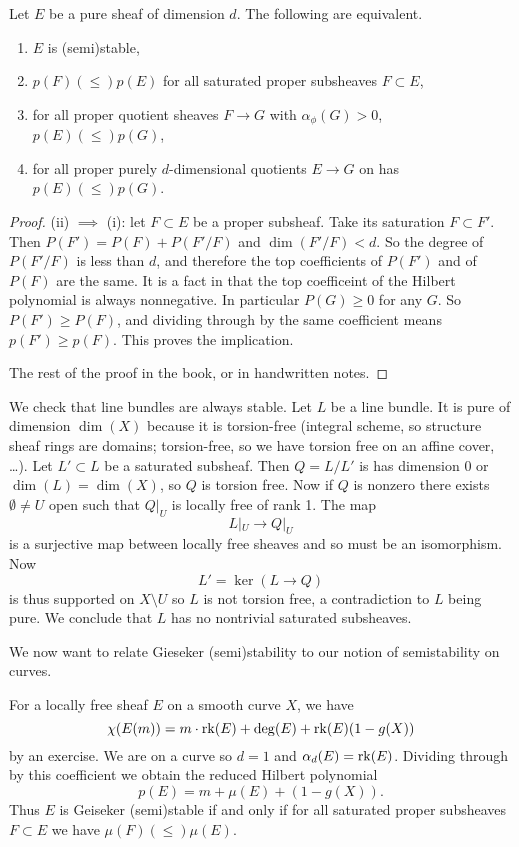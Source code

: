 \begin{proposition}
	Let $E$ be a pure sheaf of dimension $d$. The following are equivalent. 
	\begin{enumerate}[label=(\roman*)]
    	\item $E$ is (semi)stable,
		\item $p(F) (\leq) p(E)$ for all saturated proper subsheaves $F \subset E$,
		\item for all proper quotient sheaves $F \to G$ with $\alpha_\phi(G) > 0$, $p(E) (\leq) p(G)$, 
		\item for all proper purely $d$-dimensional quotients $E \to G$ on has $p(E) (\leq) p(G)$. 
    \end{enumerate}
\end{proposition}
\begin{proof}
	(ii) $\implies$ (i): let $F \subset E$ be a proper subsheaf. Take its saturation $F \subset F'$. Then $P(F') = P(F) + P(F'/F)$ and $\dim(F'/F) < d$.  
	So the degree of $P(F'/F)$ is less than $d$, and therefore the top coefficients of $P(F')$ and of $P(F)$ are the same. 
	It is a fact in \cite{huybrechts2010geometry} that the top coefficeint of the Hilbert polynomial is always nonnegative. In particular $P(G) \geq 0$ for any $G$. So $P(F') \geq P(F)$, and dividing through by the same coefficient means $p(F') \geq p(F)$. This proves the implication. 
	
	The rest of the proof in the book, or in handwritten notes.
\end{proof}

\begin{example}
	We check that line bundles are always stable. Let $L$ be a line bundle. It is pure of dimension $\dim(X)$ because it is torsion-free (integral scheme, so structure sheaf rings are domains; torsion-free, so we have torsion free on an affine cover, \dots).
	Let $L' \subset L$ be a saturated subsheaf. Then $Q=L/L'$ is has dimension $0$ or $\dim(L) = \dim(X)$, so $Q$ is torsion free.
	Now if $Q$ is nonzero there exists $\emptyset \neq U$ open such that $Q|_U$ is locally free of rank 1. The map \[
    	L|_U \to Q|_U
    \] is a surjective map between locally free sheaves and so must be an isomorphism. Now \[L' = \ker(L \to Q)\] is thus supported on $X\setminus U$ so $L$ is not torsion free, a contradiction to $L$ being pure. We conclude that $L$ has no nontrivial saturated subsheaves. 
\end{example}

We now want to relate Gieseker (semi)stability to our notion of semistability on curves. 
\begin{example}
For a locally free sheaf $E$ on a smooth curve $X$, we have \[
	\chi(E(m)) = m \cdot \operatorname{rk}(E) + \deg(E) + \operatorname{rk}(E)(1-g(X))
\] by an exercise. We are on a curve so $d = 1$ and $\alpha_d(E) = \operatorname{rk}(E)$. Dividing through by this coefficient we obtain the reduced Hilbert polynomial \[
	p(E) = m + \mu(E) + (1-g(X)).
\] Thus $E$ is Geiseker (semi)stable if and only if for all saturated proper subsheaves $F \subset E$ we have $\mu(F) (\leq) \mu(E)$. 
\end{example}

